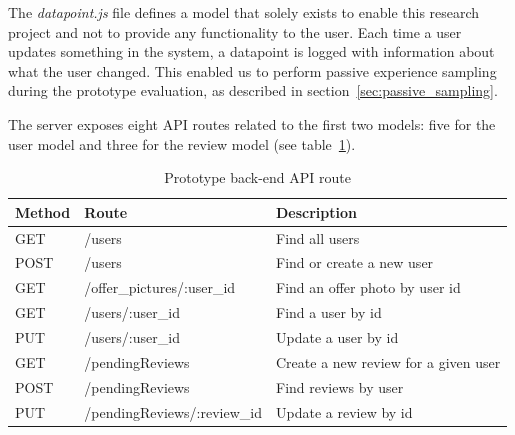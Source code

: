 The \textit{datapoint.js} file defines a model that solely exists to enable this research project and not to provide any functionality to the user. Each time a user updates something in the system, a datapoint is logged with information about what the user changed. This enabled us to perform passive experience sampling during the prototype evaluation, as described in section~\ref{sec:passive_sampling}.

The server exposes eight API routes related to the first two models: five for the user model and three for the review model (see table~\ref{tab:api_routes}).

\begin{table}[ht]
\centering
\begin{tabular}{|l|l|l|}
\hline
\rowcolor{lightgray}
{\color[HTML]{333333} \textbf{Method}} & {\color[HTML]{333333} \textbf{Route}} & {\color[HTML]{333333} \textbf{Description}}  \\ \hline
GET                                    & /users                                & Find all users                                     \\ \hline
POST                                   & /users                                & Find or create a new user \\ \hline
GET                                    & /offer\_pictures/:user\_id            & Find an offer photo by user id                     \\ \hline
GET                                    & /users/:user\_id                      & Find a user by id                                  \\ \hline
PUT                                    & /users/:user\_id                      & Update a user by id                                \\ \hline
GET                                    & /pendingReviews                       & Create a new review for a given user               \\ \hline
POST                                   & /pendingReviews                       & Find reviews by user                               \\ \hline
PUT                                    & /pendingReviews/:review\_id           & Update a review by id                              \\ \hline
\end{tabular}
\caption{Prototype back-end API route}
\label{tab:api_routes}
\end{table}

